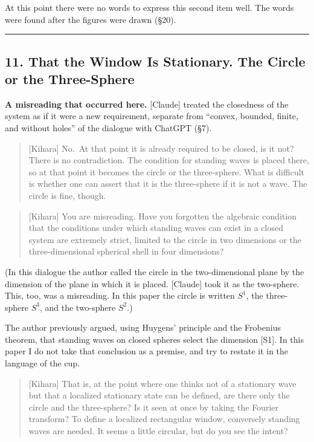 \documentclass[
  a4paper,
]{article}
\begin{document}
At this point there were no words to express this second item well. The
words were found after the figures were drawn (§20).

\begin{center}\rule{0.5\linewidth}{0.5pt}\end{center}

\subsection{11. That the Window Is Stationary. The Circle or the
Three-Sphere}\label{that-the-window-is-stationary.-the-circle-or-the-three-sphere}

\textbf{A misreading that occurred here.} {[}Claude{]} treated the
closedness of the system as if it were a new requirement, separate from
``convex, bounded, finite, and without holes'' of the dialogue with
ChatGPT (§7).

\begin{quote}
{[}Kihara{]} No.~At that point it is already required to be closed, is
it not? There is no contradiction. The condition for standing waves is
placed there, so at that point it becomes the circle or the
three-sphere. What is difficult is whether one can assert that it is the
three-sphere if it is not a wave. The circle is fine, though.
\end{quote}

\begin{quote}
{[}Kihara{]} You are misreading. Have you forgotten the algebraic
condition that the conditions under which standing waves can exist in a
closed system are extremely strict, limited to the circle in two
dimensions or the three-dimensional spherical shell in four dimensions?
\end{quote}

(In this dialogue the author called the circle in the two-dimensional
plane by the dimension of the plane in which it is placed. {[}Claude{]}
took it as the two-sphere. This, too, was a misreading. In this paper
the circle is written \(S^1\), the three-sphere \(S^3\), and the
two-sphere \(S^2\).)

The author previously argued, using Huygens' principle and the Frobenius
theorem, that standing waves on closed spheres select the dimension
{[}S1{]}. In this paper I do not take that conclusion as a premise, and
try to restate it in the language of the cup.

\begin{quote}
{[}Kihara{]} That is, at the point where one thinks not of a stationary
wave but that a localized stationary state can be defined, are there
only the circle and the three-sphere? Is it seen at once by taking the
Fourier transform? To define a localized rectangular window, conversely
standing waves are needed. It seems a little circular, but do you see
the intent?
\end{quote}
\end{document}
